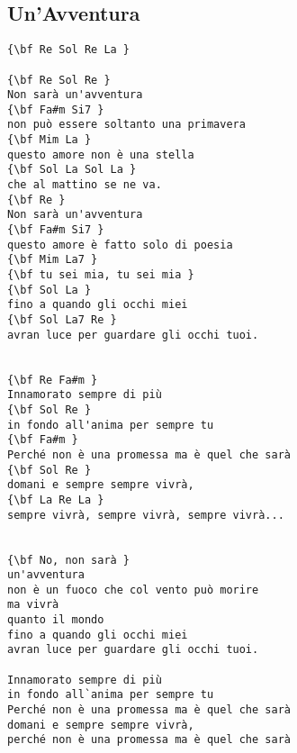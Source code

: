 \documentclass[a4paper]{article}
\begin{document}
\subsection{Un'Avventura} %
\label{sub:Un'Avventur}
\begin{Verbatim}[commandchars=\\\{\}]
{\bf Re Sol Re La }

{\bf Re Sol Re }
Non sarà un'avventura 
{\bf Fa#m Si7 }
non può essere soltanto una primavera 
{\bf Mim La }
questo amore non è una stella 
{\bf Sol La Sol La }
che al mattino se ne va. 
{\bf Re }
Non sarà un'avventura 
{\bf Fa#m Si7 }
questo amore è fatto solo di poesia 
{\bf Mim La7 }
{\bf tu sei mia, tu sei mia }
{\bf Sol La }
fino a quando gli occhi miei 
{\bf Sol La7 Re }
avran luce per guardare gli occhi tuoi. 


{\bf Re Fa#m }
Innamorato sempre di più 
{\bf Sol Re }
in fondo all'anima per sempre tu 
{\bf Fa#m }
Perché non è una promessa ma è quel che sarà 
{\bf Sol Re }
domani e sempre sempre vivrà, 
{\bf La Re La }
sempre vivrà, sempre vivrà, sempre vivrà... 


{\bf No, non sarà }
un'avventura 
non è un fuoco che col vento può morire 
ma vivrà 
quanto il mondo 
fino a quando gli occhi miei 
avran luce per guardare gli occhi tuoi. 

Innamorato sempre di più 
in fondo all`anima per sempre tu 
Perché non è una promessa ma è quel che sarà 
domani e sempre sempre vivrà, 
perché non è una promessa ma è quel che sarà
\end{Verbatim}
\newpage


\end{document}
